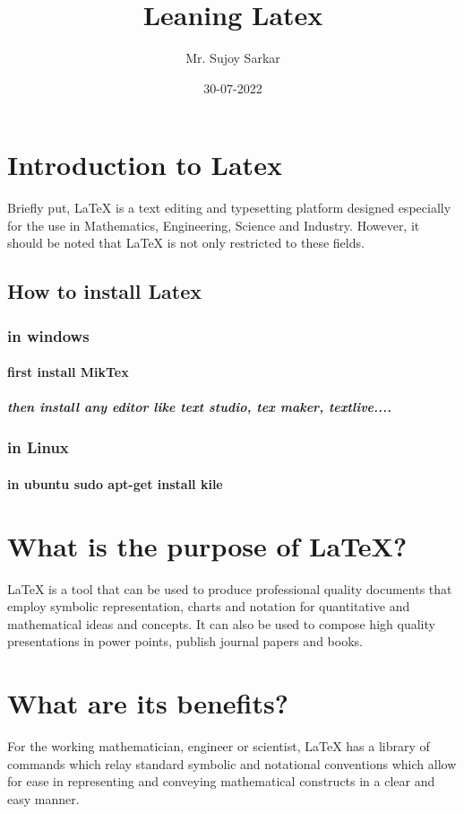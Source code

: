 \documentclass[12pt]{article}
\title{Leaning Latex}
\author{Mr. Sujoy Sarkar}
\date{30-07-2022}
\begin{document}
\maketitle
\tableofcontents
\section{Introduction to Latex}

Briefly put, LaTeX is a text editing and typesetting platform designed
especially for the use in Mathematics, Engineering, Science and Industry.
However, it should be noted that LaTeX is not only restricted to these
fields.
\subsection{How to install Latex}
\subsubsection{in windows}
\paragraph{first install MikTex}
\subparagraph{then install any editor like text studio, tex maker, textlive....}
\subsubsection{in Linux}
\paragraph{in ubuntu sudo apt-get install kile}

\section{What is the purpose of LaTeX?}
LaTeX is a tool that can be used to produce professional quality
documents that employ symbolic representation, charts and notation for
quantitative and mathematical ideas and concepts. It can also be used to
compose high quality presentations in power points, publish journal papers
and books.
\section{What are its benefits?}


For the working mathematician, engineer or scientist, LaTeX has a library
of commands which relay standard symbolic and notational conventions
which allow for ease in representing and conveying mathematical
constructs in a clear and easy manner.
\end{document}
